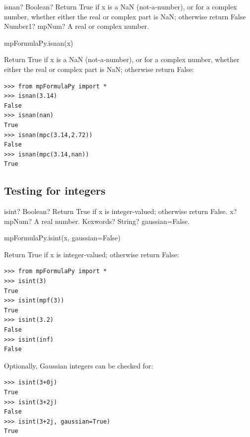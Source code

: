 \begin{mpFunctionsExtract}
	\mpFunctionOne
	{isnan? Boolean?  Return True if x is a NaN (not-a-number), or for a complex number, whether either the real or complex part is NaN; otherwise return False}
	{Number1? mpNum? A real or complex number.}
\end{mpFunctionsExtract}



mpFormulaPy.isnan(x)

\vpara
Return True if x is a NaN (not-a-number), or for a complex number, whether either the real or complex part is NaN; otherwise return False:

\begin{lstlisting}
>>> from mpFormulaPy import *
>>> isnan(3.14)
False
>>> isnan(nan)
True
>>> isnan(mpc(3.14,2.72))
False
>>> isnan(mpc(3.14,nan))
True
\end{lstlisting}





\subsection{Testing for integers}


\begin{mpFunctionsExtract}
	\mpFunctionTwo
	{isint? Boolean? Return True if x is integer-valued; otherwise return False.}
	{x? mpNum? A real number.}
	{Kexwords? String? gaussian=False.}	
\end{mpFunctionsExtract}



mpFormulaPy.isint(x, gaussian=False)

\vpara
Return True if x is integer-valued; otherwise return False:

\begin{lstlisting}
>>> from mpFormulaPy import *
>>> isint(3)
True
>>> isint(mpf(3))
True
>>> isint(3.2)
False
>>> isint(inf)
False
\end{lstlisting}


Optionally, Gaussian integers can be checked for:

\begin{lstlisting}
>>> isint(3+0j)
True
>>> isint(3+2j)
False
>>> isint(3+2j, gaussian=True)
True
\end{lstlisting}


